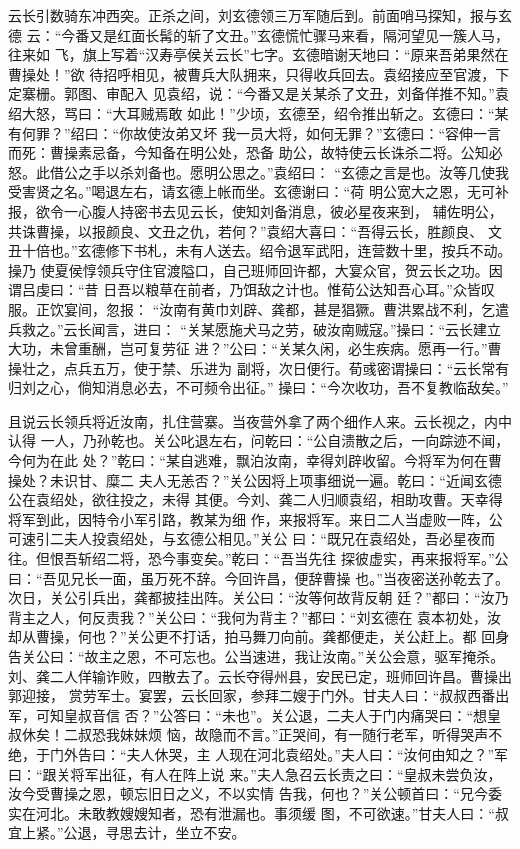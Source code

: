 云长引数骑东冲西突。正杀之间，刘玄德领三万军随后到。前面哨马探知，报与玄德
云：“今番又是红面长髯的斩了文丑。”玄德慌忙骤马来看，隔河望见一簇人马，往来如
飞，旗上写着“汉寿亭侯关云长”七字。玄德暗谢天地曰：“原来吾弟果然在曹操处！”欲
待招呼相见，被曹兵大队拥来，只得收兵回去。袁绍接应至官渡，下定寨栅。郭图、审配入
见袁绍，说：“今番又是关某杀了文丑，刘备佯推不知。”袁绍大怒，骂曰：“大耳贼焉敢
如此！”少顷，玄德至，绍令推出斩之。玄德曰：“某有何罪？”绍曰：“你故使汝弟又坏
我一员大将，如何无罪？”玄德曰：“容伸一言而死：曹操素忌备，今知备在明公处，恐备
助公，故特使云长诛杀二将。公知必怒。此借公之手以杀刘备也。愿明公思之。”袁绍曰：
“玄德之言是也。汝等几使我受害贤之名。”喝退左右，请玄德上帐而坐。玄德谢曰：“荷
明公宽大之恩，无可补报，欲令一心腹人持密书去见云长，使知刘备消息，彼必星夜来到，
辅佐明公，共诛曹操，以报颜良、文丑之仇，若何？”袁绍大喜曰：“吾得云长，胜颜良、
文丑十倍也。”玄德修下书札，未有人送去。绍令退军武阳，连营数十里，按兵不动。操乃
使夏侯惇领兵守住官渡隘口，自己班师回许都，大宴众官，贺云长之功。因谓吕虔曰：“昔
日吾以粮草在前者，乃饵敌之计也。惟荀公达知吾心耳。”众皆叹服。正饮宴间，忽报：
“汝南有黄巾刘辟、龚都，甚是猖獗。曹洪累战不利，乞遣兵救之。”云长闻言，进曰：
“关某愿施犬马之劳，破汝南贼寇。”操曰：“云长建立大功，未曾重酬，岂可复劳征
进？”公曰：“关某久闲，必生疾病。愿再一行。”曹操壮之，点兵五万，使于禁、乐进为
副将，次日便行。荀彧密谓操曰：“云长常有归刘之心，倘知消息必去，不可频令出征。”
操曰：“今次收功，吾不复教临敌矣。”

且说云长领兵将近汝南，扎住营寨。当夜营外拿了两个细作人来。云长视之，内中认得
一人，乃孙乾也。关公叱退左右，问乾曰：“公自溃散之后，一向踪迹不闻，今何为在此
处？”乾曰：“某自逃难，飘泊汝南，幸得刘辟收留。今将军为何在曹操处？未识甘、糜二
夫人无恙否？”关公因将上项事细说一遍。乾曰：“近闻玄德公在袁绍处，欲往投之，未得
其便。今刘、龚二人归顺袁绍，相助攻曹。天幸得将军到此，因特令小军引路，教某为细
作，来报将军。来日二人当虚败一阵，公可速引二夫人投袁绍处，与玄德公相见。”关公
曰：“既兄在袁绍处，吾必星夜而往。但恨吾斩绍二将，恐今事变矣。”乾曰：“吾当先往
探彼虚实，再来报将军。”公曰：“吾见兄长一面，虽万死不辞。今回许昌，便辞曹操
也。”当夜密送孙乾去了。次日，关公引兵出，龚都披挂出阵。关公曰：“汝等何故背反朝
廷？”都曰：“汝乃背主之人，何反责我？”关公曰：“我何为背主？”都曰：“刘玄德在
袁本初处，汝却从曹操，何也？”关公更不打话，拍马舞刀向前。龚都便走，关公赶上。都
回身告关公曰：“故主之恩，不可忘也。公当速进，我让汝南。”关公会意，驱军掩杀。
刘、龚二人佯输诈败，四散去了。云长夺得州县，安民已定，班师回许昌。曹操出郭迎接，
赏劳军士。宴罢，云长回家，参拜二嫂于门外。甘夫人曰：“叔叔西番出军，可知皇叔音信
否？”公答曰：“未也”。关公退，二夫人于门内痛哭曰：“想皇叔休矣！二叔恐我妹妹烦
恼，故隐而不言。”正哭间，有一随行老军，听得哭声不绝，于门外告曰：“夫人休哭，主
人现在河北袁绍处。”夫人曰：“汝何由知之？”军曰：“跟关将军出征，有人在阵上说
来。”夫人急召云长责之曰：“皇叔未尝负汝，汝今受曹操之恩，顿忘旧日之义，不以实情
告我，何也？”关公顿首曰：“兄今委实在河北。未敢教嫂嫂知者，恐有泄漏也。事须缓
图，不可欲速。”甘夫人曰：“叔宜上紧。”公退，寻思去计，坐立不安。

